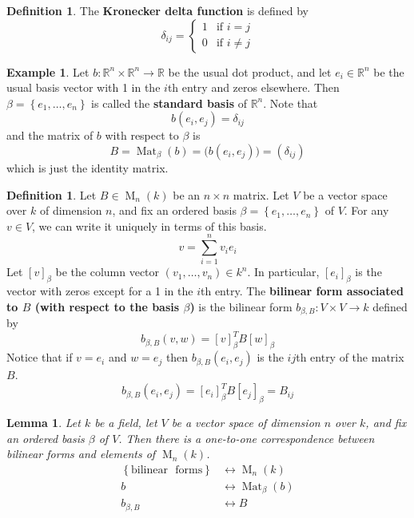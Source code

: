 \documentclass[12pt]{article}
\newtheorem{lemma}[theorem]{Lemma}
\theoremstyle{definition}
\newtheorem{definition}[theorem]{Definition}
\newtheorem{example}[theorem]{Example}
\newcommand{\R}{\mathbb{R}}
\newcommand{\lb}{\left\{}
\newcommand{\rb}{\right\}}
\newcommand{\tbf}{\textbf}
\DeclareMathOperator{\M}{M}
\DeclareMathOperator{\Mat}{Mat}
\begin{document}
\begin{definition}
The \tbf{Kronecker delta function} is defined by
\[
	\delta_{ij} =
	\begin{cases}
		1 & \text{if } i = j \\
		0 & \text{if } i \neq j
	\end{cases}
\]
\end{definition}

\begin{example}
Let $b:\R^n \times \R^n \to \R$ be the usual dot product, and let $e_i \in \R^n$ be the usual basis vector with 1 in the $i$th entry and zeros elsewhere. Then $\beta = \lb e_1, \ldots, e_n \rb$ is called the \tbf{standard basis} of $\R^n$. Note that
\[
	b(e_i, e_j) = \delta_{ij}
\]
and the matrix of $b$ with respect to $\beta$ is
\[
	B = \Mat_\beta(b) = \Big( b(e_i, e_j) \Big) = (\delta_{ij})
\]
which is just the identity matrix.
\end{example}

\begin{definition}
Let $B \in \M_n(k)$ be an $n \times n$ matrix. Let $V$ be a vector space over $k$ of dimension $n$, and fix an ordered basis $\beta = \lb e_1, \ldots, e_n \rb$ of $V$. For any $v \in V$, we can write it uniquely in terms of this basis.
\[
	v = \sum_{i=1}^n v_i e_i
\]
Let $[v]_\beta$ be the column vector $(v_1, \ldots, v_n) \in k^n$. In particular, $[e_i]_\beta$ is the vector with zeros except for a 1 in the $i$th entry. The \tbf{bilinear form associated to $B$ (with respect to the basis $\beta$)} is the bilinear form $b_{\beta, B}:V \times V \to k$ defined by
\[
	b_{\beta, B}(v, w) = [v]_\beta^T B [w]_\beta
\]
Notice that if $v = e_i$ and $w = e_j$ then $b_{\beta, B}(e_i, e_j)$ is the $ij$th entry of the matrix $B$.
\[
	b_{\beta, B}(e_i,e_j) = [e_i]_\beta^T B [e_j]_\beta = B_{ij}
\]
\end{definition}

\begin{lemma}
Let $k$ be a field, let $V$ be a vector space of dimension $n$ over $k$, and fix an ordered basis $\beta$ of $V$. Then there is a one-to-one correspondence between bilinear forms and elements of $\M_n(k)$.
\begin{align*}
	\lb \mathrm{bilinear} \text{ } \mathrm{forms} \rb &\leftrightarrow \M_n(k) \\
	b &\leftrightarrow \Mat_\beta(b) \\
	b_{\beta, B} &\leftrightarrow B
\end{align*}
\end{lemma}
\end{document}
